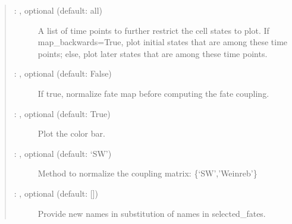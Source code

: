 \documentclass[letterpaper,10pt,english]{sphinxmanual}
\begin{document}
\begin{fulllineitems}
\begin{quote}
\begin{description}
\begin{description}
\item[{ : , optional (default: all)}] \leavevmode
A list of time points to further restrict the cell states to plot.
If map\_backwards=True, plot initial states that are among these time points;
else, plot later states that are among these time points.

\item[{ : , optional (default: False)}] \leavevmode
If true, normalize fate map before computing the fate coupling.

\item[{ : , optional (default: True)}] \leavevmode
Plot the color bar.

\item[{ : , optional (default: ‘SW’)}] \leavevmode
Method to normalize the coupling matrix: \{‘SW’,’Weinreb’\}

\item[{ : , optional (default: {[}{]})}] \leavevmode
Provide new names in substitution of names in selected\_fates.

\end{description}

\end{description}\end{quote}

\end{fulllineitems}


\end{document}
